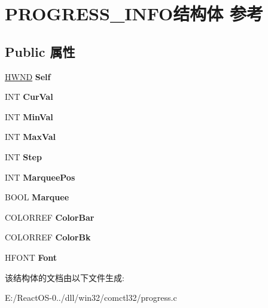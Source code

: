 \hypertarget{struct_p_r_o_g_r_e_s_s___i_n_f_o}{}\section{P\+R\+O\+G\+R\+E\+S\+S\+\_\+\+I\+N\+F\+O结构体 参考}
\label{struct_p_r_o_g_r_e_s_s___i_n_f_o}
\subsection*{Public 属性}
\begin{DoxyCompactItemize}
\item 
\mbox{\label{struct_p_r_o_g_r_e_s_s___i_n_f_o_a4a59627a03d66045f7618e7260ba5ef8}} 
\hyperlink{interfacevoid}{H\+W\+ND} {\bfseries Self}
\item 
\mbox{\label{struct_p_r_o_g_r_e_s_s___i_n_f_o_a865b6f56eb9e2155a28aa604f30c8dc2}} 
I\+NT {\bfseries Cur\+Val}
\item 
\mbox{\label{struct_p_r_o_g_r_e_s_s___i_n_f_o_a21e1e92f482b53d622eab9a035220fdd}} 
I\+NT {\bfseries Min\+Val}
\item 
\mbox{\label{struct_p_r_o_g_r_e_s_s___i_n_f_o_aa1b725f92f4255620397246d68d0d877}} 
I\+NT {\bfseries Max\+Val}
\item 
\mbox{\label{struct_p_r_o_g_r_e_s_s___i_n_f_o_a37f3c70aa2f5c7b4f4c849a0238fbeba}} 
I\+NT {\bfseries Step}
\item 
\mbox{\label{struct_p_r_o_g_r_e_s_s___i_n_f_o_a4cbfa850df98a935a495ea3cdf44c420}} 
I\+NT {\bfseries Marquee\+Pos}
\item 
\mbox{\label{struct_p_r_o_g_r_e_s_s___i_n_f_o_abc7cb46ae6fa05d768702178efcdc657}} 
B\+O\+OL {\bfseries Marquee}
\item 
\mbox{\label{struct_p_r_o_g_r_e_s_s___i_n_f_o_a55612a05b5d365d8b3bb9e3837d0169d}} 
C\+O\+L\+O\+R\+R\+EF {\bfseries Color\+Bar}
\item 
\mbox{\label{struct_p_r_o_g_r_e_s_s___i_n_f_o_a650206587ed9f1df84f6e8da71efe6a7}} 
C\+O\+L\+O\+R\+R\+EF {\bfseries Color\+Bk}
\item 
\mbox{\label{struct_p_r_o_g_r_e_s_s___i_n_f_o_aecc7b7b31685dd660602e6481957b1bc}} 
H\+F\+O\+NT {\bfseries Font}
\end{DoxyCompactItemize}


该结构体的文档由以下文件生成\+:\begin{DoxyCompactItemize}
\item 
E\+:/\+React\+O\+S-\/0../dll/win32/comctl32/progress.\+c\end{DoxyCompactItemize}

